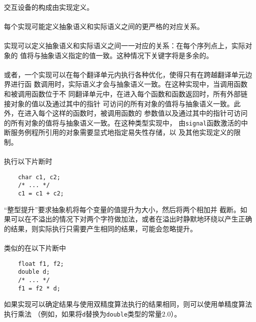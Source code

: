 \paragraph{}
交互设备的构成由实现定义。

\paragraph{}
每个实现可能定义抽象语义和实际语义之间的更严格的对应关系。

\paragraph{}
\ex 实现可以定义抽象语义和实际语义之间一一对应的关系：在每个序列点上，实际对象的
值将与抽象语义指定的值一致。这种情况下关键字将是多余的。

\paragraph{}
或者，一个实现可以在每个翻译单元内执行各种优化，使得只有在跨越翻译单元边界进行函
数调用时，实际语义才会与抽象语义一致。在这种实现中，当调用函数和被调用函数位于不
同翻译单元中，在进入每个函数和函数返回时，所有外部链接对象的值以及通过其中的指针
可访问的所有对象的值将与抽象语义一致。此外，在进入每个这样的函数时，被调用函数的
参数值以及通过其中的指针可访问的所有对象的值将与抽象语义一致。在这种类型实现中，
由\texttt{signal}函数激活的中断服务例程所引用的对象需要显式地指定易失性存储，以
及其他实现定义的限制。

\paragraph{}
\ex 执行以下片断时
\begin{lstlisting}
    char c1, c2;
    /* ... */
    c1 = c1 + c2;
\end{lstlisting}
``整型提升''要求抽象机将每个变量的值提升为大小，然后将两个相加并
截断。如果可以在不溢出的情况下对两个字符做加法，或者在溢出时静默地环绕以产生正确
的结果，则实际执行只需要产生相同的结果，可能会忽略提升。

\paragraph{}
\ex 类似的在以下片断中
\begin{lstlisting}
    float f1, f2;
    double d;
    /* ... */
    f1 = f2 * d;
\end{lstlisting}
如果实现可以确定结果与使用双精度算法执行的结果相同，则可以使用单精度算法执行乘法
（例如，如果将\texttt{d}替换为\texttt{double}类型的常量$2.0$）。

